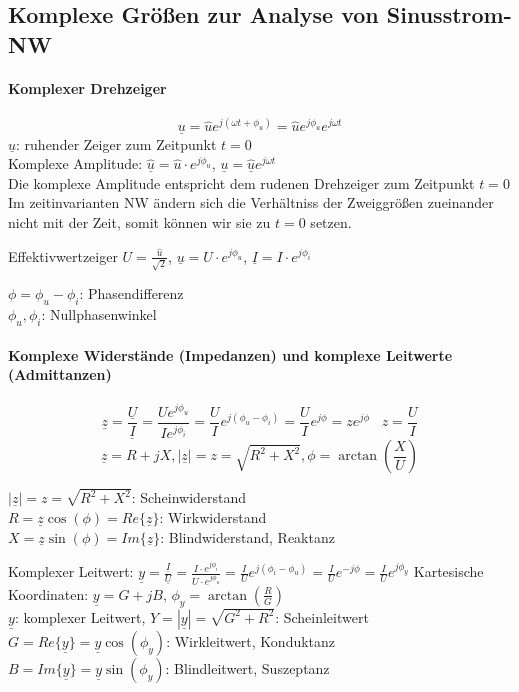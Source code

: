 \documentclass[german]{article}
\begin{document}
\subsection{Komplexe Größen zur Analyse von Sinusstrom-NW}

\paragraph{Komplexer Drehzeiger}
\[ \underline{u} = \hat{u} e^{j(\omega t + \phi_u)} = \hat{u} e^{j\phi_u} e^{j\omega t} \]
$\underline{u}$: ruhender Zeiger zum Zeitpunkt $t=0$ \\
Komplexe Amplitude: $\underline{\hat{u}} = \hat{u} \cdot e^{j\phi_u}$, $\underline{u} = \underline{\hat{u}} e^{j\omega t}$ \\
Die komplexe Amplitude entspricht dem rudenen Drehzeiger zum Zeitpunkt $t=0$ \\
Im zeitinvarianten NW ändern sich die Verhältniss der Zweiggrößen zueinander nicht mit der Zeit, somit können wir sie zu $t=0$ setzen.

Effektivwertzeiger $U = \frac{\hat{u}}{\sqrt{2}}$, $\underline{u} = U \cdot e^{j\phi_u}$, $\underline{I} = I \cdot e^{j\phi_i}$

$\phi = \phi_u - \phi_i$: Phasendifferenz \\
$\phi_u, \phi_i$: Nullphasenwinkel

\paragraph{Komplexe Widerstände (Impedanzen) und komplexe Leitwerte (Admittanzen)}
\[ \underline{z} = \frac{\underline{U}}{\underline{I}} = \frac{U e^{j\phi_u}}{I e^{j\phi_i}} = \frac{U}{I} e^{j(\phi_u - \phi_i)} = \frac{U}{I} e^{j\phi} = z e^{j\phi} \hspace{10pt} z = \frac{U}{I} \]
\[ \underline{z} = R + jX, |\underline{z}| = z = \sqrt{R^2 + X^2}, \phi = \arctan\left( \frac{X}{U} \right) \]

$|\underline{z}| = z = \sqrt{R^2 + X^2}$: Scheinwiderstand \\
$R = \underline{z} \cos(\phi) = Re\{\underline{z}\}$: Wirkwiderstand \\
$X = \underline{z} \sin(\phi) = Im\{\underline{z}\}$: Blindwiderstand, Reaktanz

Komplexer Leitwert: $\underline{y} = \frac{\underline{I}}{\underline{U}} = \frac{I \cdot e^{j\phi_i}}{U \cdot e^{j\phi_u}} = \frac{I}{U} e^{j(\phi_i - \phi_u)} = \frac{I}{U} e^{-j\phi} = \frac{I}{U} e^{j\phi_y}$
Kartesische Koordinaten: $\underline{y} = G + jB$, $\phi_y = \arctan\left( \frac{R}{G} \right)$ \\
$\underline{y}$: komplexer Leitwert, $Y = |\underline{y}| = \sqrt{G^2 + R^2}$: Scheinleitwert \\
$G = Re\{\underline{y}\} = \underline{y} \cos(\phi_y)$: Wirkleitwert, Konduktanz \\
$B = Im\{\underline{y}\} = \underline{y} \sin(\phi_y)$: Blindleitwert, Suszeptanz
\end{document}
